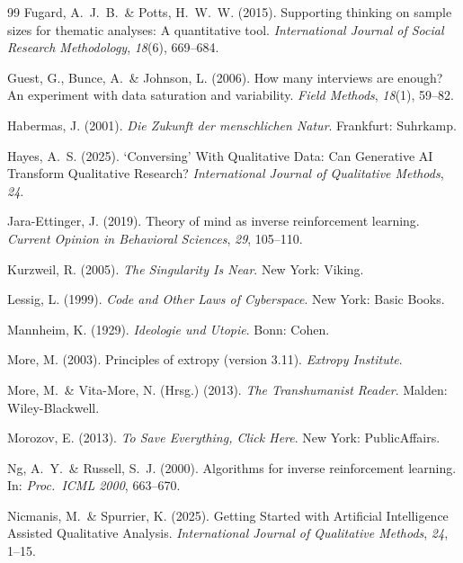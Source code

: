 \documentclass[12pt,a4paper]{article}
\begin{document}
\begin{thebibliography}{99}
  Fugard, A.~J.~B.~\& Potts, H.~W.~W. (2015).
  Supporting thinking on sample sizes for thematic analyses: A quantitative tool.
  \textit{International Journal of Social Research Methodology}, \textit{18}(6), 669--684.

  Guest, G., Bunce, A.~\& Johnson, L. (2006).
  How many interviews are enough? An experiment with data saturation and variability.
  \textit{Field Methods}, \textit{18}(1), 59--82.

  Habermas, J. (2001).
  \textit{Die Zukunft der menschlichen Natur}.
  Frankfurt: Suhrkamp.

  Hayes, A.~S. (2025).
  `Conversing' With Qualitative Data: Can Generative AI Transform Qualitative Research?
  \textit{International Journal of Qualitative Methods}, \textit{24}.

  Jara-Ettinger, J. (2019).
  Theory of mind as inverse reinforcement learning.
  \textit{Current Opinion in Behavioral Sciences}, \textit{29}, 105--110.

  Kurzweil, R. (2005).
  \textit{The Singularity Is Near}.
  New York: Viking.

  Lessig, L. (1999).
  \textit{Code and Other Laws of Cyberspace}.
  New York: Basic Books.

  Mannheim, K. (1929).
  \textit{Ideologie und Utopie}.
  Bonn: Cohen.

  More, M. (2003).
  Principles of extropy (version 3.11).
  \textit{Extropy Institute}.

  More, M.~\& Vita-More, N. (Hrsg.) (2013).
  \textit{The Transhumanist Reader}.
  Malden: Wiley-Blackwell.

  Morozov, E. (2013).
  \textit{To Save Everything, Click Here}.
  New York: PublicAffairs.

  Ng, A.~Y.~\& Russell, S.~J. (2000).
  Algorithms for inverse reinforcement learning.
  In: \textit{Proc.\ ICML 2000}, 663--670.

  Nicmanis, M.~\& Spurrier, K. (2025).
  Getting Started with Artificial Intelligence Assisted Qualitative Analysis.
  \textit{International Journal of Qualitative Methods}, \textit{24}, 1--15.


\end{thebibliography}
\end{document}
